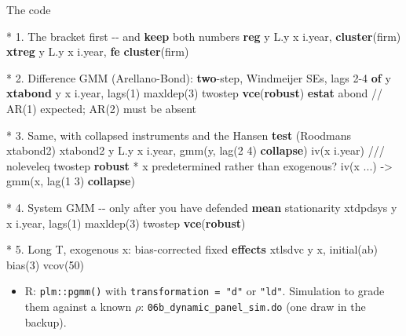 \documentclass[
  11pt,
  ignorenonframetext,
  aspectratio=169,
]{beamer}
\newenvironment{Shaded}{\begin{snugshade}}{\end{snugshade}}
\newcommand{\CommentTok}[1]{\textcolor[rgb]{0.37,0.37,0.37}{#1}}
\newcommand{\FunctionTok}[1]{\textcolor[rgb]{0.28,0.35,0.67}{#1}}
\newcommand{\KeywordTok}[1]{\textcolor[rgb]{0.00,0.23,0.31}{\textbf{#1}}}
\newcommand{\NormalTok}[1]{\textcolor[rgb]{0.00,0.23,0.31}{#1}}
\providecommand{\tightlist}{%
  \setlength{\itemsep}{0pt}\setlength{\parskip}{0pt}}
\begin{document}
\begin{frame}[fragile]{The code}
\protect{}\label{the-code}
\begin{Shaded}
\begin{Highlighting}[]
\NormalTok{* 1. The bracket first {-}{-} and }\KeywordTok{keep}\NormalTok{ both numbers}
\KeywordTok{reg}   \FunctionTok{y}\NormalTok{ L.}\FunctionTok{y}\NormalTok{ x i.}\FunctionTok{year}\NormalTok{, }\KeywordTok{cluster}\NormalTok{(firm)}
\KeywordTok{xtreg} \FunctionTok{y}\NormalTok{ L.}\FunctionTok{y}\NormalTok{ x i.}\FunctionTok{year}\NormalTok{, }\KeywordTok{fe} \KeywordTok{cluster}\NormalTok{(firm)}

\NormalTok{* 2. Difference GMM (Arellano{-}Bond): }\KeywordTok{two}\NormalTok{{-}step, Windmeijer SEs, lags 2{-}4 }\KeywordTok{of} \FunctionTok{y}
\KeywordTok{xtabond} \FunctionTok{y}\NormalTok{ x i.}\FunctionTok{year}\NormalTok{, lags(1) maxldep(3) twostep }\KeywordTok{vce}\NormalTok{(}\KeywordTok{robust}\NormalTok{)}
\KeywordTok{estat}\NormalTok{ abond                       }\CommentTok{// AR(1) expected; AR(2) must be absent}

\NormalTok{* 3. Same, with collapsed instruments and the Hansen }\KeywordTok{test}\NormalTok{ (Roodman\textquotesingle{}s xtabond2)}
\NormalTok{xtabond2 }\FunctionTok{y}\NormalTok{ L.}\FunctionTok{y}\NormalTok{ x i.}\FunctionTok{year}\NormalTok{, gmm(}\FunctionTok{y}\NormalTok{, lag(2 4) }\KeywordTok{collapse}\NormalTok{) iv(x i.}\FunctionTok{year}\NormalTok{) }\CommentTok{///}
\NormalTok{         noleveleq twostep }\KeywordTok{robust}
\NormalTok{*    x predetermined rather than exogenous? iv(x ...) {-}\textgreater{} gmm(x, lag(1 3) }\KeywordTok{collapse}\NormalTok{)}

\NormalTok{* 4. System GMM {-}{-} only after you have defended }\KeywordTok{mean}\NormalTok{ stationarity}
\NormalTok{xtdpdsys }\FunctionTok{y}\NormalTok{ x i.}\FunctionTok{year}\NormalTok{, lags(1) maxldep(3) twostep }\KeywordTok{vce}\NormalTok{(}\KeywordTok{robust}\NormalTok{)}

\NormalTok{* 5. Long T, exogenous x: bias{-}corrected fixed }\KeywordTok{effects}
\NormalTok{xtlsdvc }\FunctionTok{y}\NormalTok{ x, initial(ab) bias(3) vcov(50)}
\end{Highlighting}
\end{Shaded}

\begin{itemize}
\tightlist
\item
  R: \texttt{plm::pgmm()} with \texttt{transformation\ =\ "d"} or
  \texttt{"ld"}. Simulation to grade them against a known \(\rho\):
  \texttt{06b\_dynamic\_panel\_sim.do} (one draw in the backup).
\end{itemize}
\end{frame}
\end{document}
